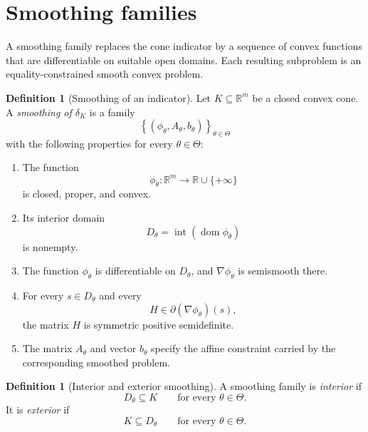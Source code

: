 \documentclass[a4paper,11pt]{book}
\theoremstyle{plain}
\theoremstyle{definition}
\newtheorem{definition}[theorem]{Definition}
\theoremstyle{remark}
\numberwithin{equation}{chapter}
\numberwithin{algorithm}{chapter}
\newcommand{\R}{\mathbb{R}}
\newcommand{\dom}{\operatorname{dom}}
\newcommand{\intr}{\operatorname{int}}
\begin{document}
	
	
	\section{Smoothing families}
	
	A smoothing family replaces the cone indicator by a sequence of convex
	functions that are differentiable on suitable open domains. Each resulting
	subproblem is an equality-constrained smooth convex problem.
	
	\begin{definition}[Smoothing of an indicator]
		Let \(K\subseteq\R^m\) be a closed convex cone. A \emph{smoothing of
			\(\delta_K\)} is a family
		\[
		\left\{
		(\phi_\theta,A_\theta,b_\theta)
		\right\}_{\theta\in\Theta}
		\]
		with the following properties for every \(\theta\in\Theta\):
		
		\begin{enumerate}
			\item The function
			\[
			\phi_\theta:\R^m\to\R\cup\{+\infty\}
			\]
			is closed, proper, and convex.
			
			\item Its interior domain
			\[
			D_\theta=\intr(\dom\phi_\theta)
			\]
			is nonempty.
			
			\item The function \(\phi_\theta\) is differentiable on \(D_\theta\), and
			\(\nabla\phi_\theta\) is semismooth there.
			
			\item For every \(s\in D_\theta\) and every
			\[
			H\in\partial(\nabla\phi_\theta)(s),
			\]
			the matrix \(H\) is symmetric positive semidefinite.
			
			\item The matrix \(A_\theta\) and vector \(b_\theta\) specify the affine
			constraint carried by the corresponding smoothed problem.
		\end{enumerate}
	\end{definition}
	
	\begin{definition}[Interior and exterior smoothing]
		A smoothing family is \emph{interior} if
		\[
		D_\theta\subseteq K
		\qquad
		\text{for every }\theta\in\Theta.
		\]
		It is \emph{exterior} if
		\[
		K\subseteq D_\theta
		\qquad
		\text{for every }\theta\in\Theta.
		\]
	\end{definition}
	
\end{document}
